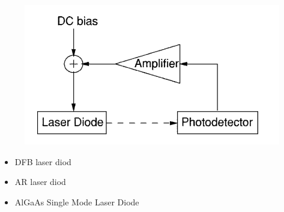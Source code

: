 

\begin{minipage}{0.45\textwidth}
\begin{figure}[h]
    \centering
    \includegraphics[width=1.1\textwidth]{images/55.png}
\end{figure}
\end{minipage}
\hfill
\begin{minipage}{0.45\textwidth}
\begin{itemize}
     \item DFB laser diod
     \item AR laser diod
     \item AlGaAs Single Mode Laser Diode
 \end{itemize} 
\end{minipage}
